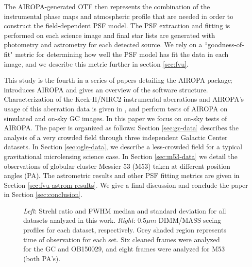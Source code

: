 \documentclass[]{spie}  %
\begin{document}
\indent The AIROPA-generated OTF then represents the combination of the instrumental phase maps and atmospheric profile that are needed in order to construct the field-dependent PSF model. The PSF extraction and fitting is performed on each science image and final star lists are generated with photometry and astrometry for each detected source. We rely on a ``goodness-of-fit" metric for determining how well the PSF model has fit the data in each image, and we describe this metric further in section \ref{sec:fvu}.

\indent This study is the fourth in a series of papers detailing the AIROPA package; \cite{witzel:2016a} introduces AIROPA and gives an overview of the software structure. Characterization of the Keck-II/NIRC2 instrumental aberrations and AIROPA's usage of this aberration data is given in \cite{Ciurlo:inprep}, and \cite{Turri:inprep} perform tests of AIROPA on simulated and on-sky GC images. In this paper we focus on on-sky tests of AIROPA. The paper is organized as follows: Section \ref{sec:gc-data} describes the analysis of a very crowded field through three independent Galactic Center datasets. In Section \ref{sec:ogle-data}, we describe a less-crowded field for a typical gravitational microlensing science case. In Section \ref{sec:m53-data} we detail the observations of globular cluster Messier 53 (M53) taken at different position angles (PA). The astrometric results and other PSF fitting metrics are given in Section \ref{sec:fvu-astrom-results}. We give a final discussion and conclude the paper in Section \ref{sec:conclusion}.

\begin{figure}[!h]
 \caption{\footnotesize \textit{Left}: Strehl ratio and FWHM median and standard deviation for all datasets analyzed in this work. \textit{Right}: 0.5$\mu m$ DIMM/MASS seeing profiles for each dataset, respectively. Grey shaded region represents time of observation for each set. Six cleaned frames were analyzed for the GC and OB150029, and eight frames were analyzed for M53 (both PA's). \label{fig:dimmmass_datasets}}
\end{figure}
\end{document}
